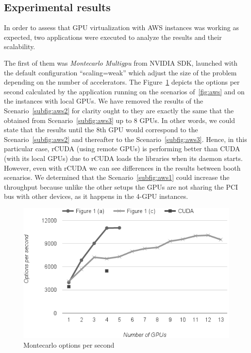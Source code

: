 \documentclass[a4paper,twoside]{article}
\begin{document}
\subsection{Experimental results}
In order to assess that GPU virtualization with AWS instances was working as expected, two applications were executed to analyze the results and their scalability.

The first of them was {\it Montecarlo Multigpu} from NVIDIA SDK, launched with the default configuration ``scaling=weak'' which adjust the size of the problem depending on the number of accelerators.
The Figure~\ref{fig:mont-opt} depicts the options per second calculated by the application running on the scenarios of~\ref{fig:aws} and on the instances with local GPUs. 
We have removed the results of the Scenario~\ref{subfig:aws2} for clarity ought to they are exactly the same that the obtained from Scenario~\ref{subfig:aws3} up to 8 GPUs. 
In other words, we could state that the results until the 8th GPU would correspond to the Scenario~\ref{subfig:aws2} and thereafter to the Scenario~\ref{subfig:aws3}.
Hence, in this particular case, rCUDA (using remote GPUs) is performing better than CUDA (with its local GPUs) due to rCUDA loads the libraries when its daemon starts.
However, even with rCUDA we can see differences in the results between booth scenarios. We determined that the Scenario~\ref{subfig:aws1} could increase the throughput because
unlike the other setups the GPUs are not sharing the PCI bus with other devices, as it happens in the 4-GPU instances.


\begin{figure}[htb]
  \centering
  \includegraphics[width=\linewidth]{images/aws-mont1.png}
  \caption{Montecarlo options per second}
  \label{fig:mont-opt}
\end{figure}
\end{document}
